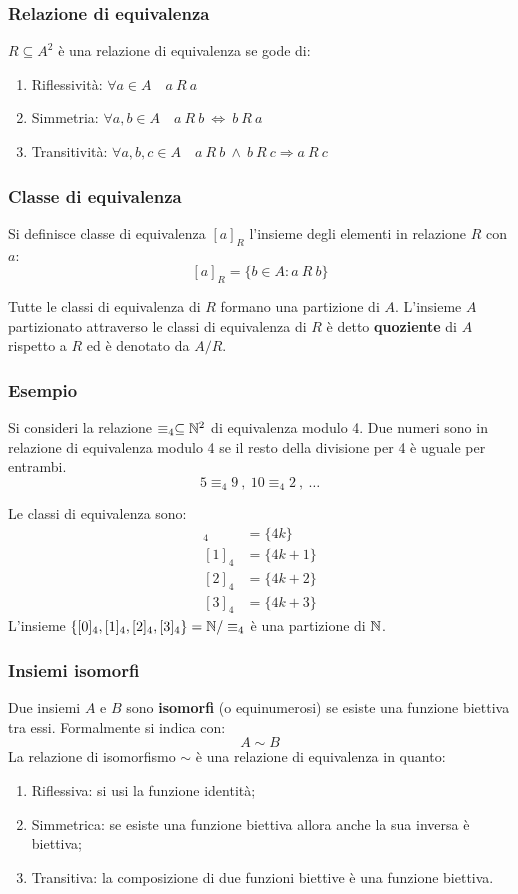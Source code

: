 \subsubsection{Relazione di equivalenza}
$R\subseteq A^2$ è una relazione di equivalenza se gode di:
\begin{enumerate}
    \item Riflessività: $\forall a \in A \quad a \ R \ a$
    \item Simmetria: $\forall a,b \in A \quad a \ R \ b \ \Leftrightarrow \ b \ R \ a$
    \item Transitività: $\forall a,b,c \in A \quad a \ R \ b
    \ \wedge \ b \ R \ c \Rightarrow a \ R \ c $
\end{enumerate}

\subsubsection{Classe di equivalenza}
Si definisce classe di equivalenza $[a]_R$ l'insieme degli elementi in relazione $R$
con $a$:
$$ [a]_R =\{b\in A: a \ R \ b\} $$

Tutte le classi di equivalenza di $R$ formano una partizione di $A$. L'insieme $A$
partizionato attraverso le classi di equivalenza di $R$ è detto \textbf{quoziente}
di $A$ rispetto a $R$ ed è denotato da $A/R$.

\subsubsection*{Esempio}
Si consideri la relazione $\equiv_4\subseteq\mathbb{N}^2$ di equivalenza modulo 4. Due numeri
sono in relazione di equivalenza modulo 4 se il resto della divisione per 4 è uguale
per entrambi.
$$ 5\equiv_4 9\ , \ 10\equiv_4 2 \ , \ \dots $$

Le classi di equivalenza sono:
\begin{align}
    [0]_4&=\{4k\}\tag{Multipli di 4}\\
    [1]_4&=\{4k+1\}\tag{Resto 1}\\
    [2]_4&=\{4k+2\}\tag{Resto 2}\\
    [3]_4&=\{4k+3\}\tag{Resto 3}
\end{align}
L'insieme $\{[0]_4,[1]_4,[2]_4,[3]_4\}=\mathbb{N}/\equiv_4$ è una partizione di $\mathbb{N}$.

\subsubsection{Insiemi isomorfi}
Due insiemi $A$ e $B$ sono \textbf{isomorfi} (o equinumerosi) se esiste una funzione
biettiva tra essi. Formalmente si indica con:
$$ A\sim B $$
La relazione di isomorfismo $\sim$ è una relazione di equivalenza in quanto:
\begin{enumerate}
    \item Riflessiva: si usi la funzione identità;
    \item Simmetrica: se esiste una funzione biettiva allora anche la sua inversa
        è biettiva;
    \item Transitiva: la composizione di due funzioni biettive è una funzione biettiva.
\end{enumerate}

